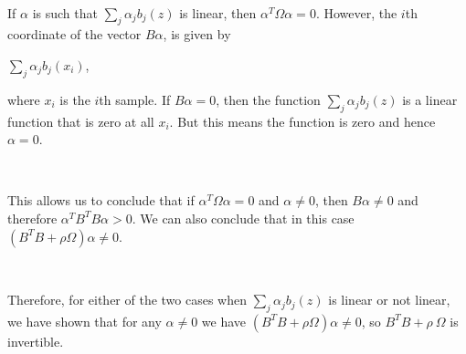 \documentclass[]{article}
\begin{document}
\begin{itemize}
\ 


If $\alpha$ is such that \( \displaystyle \sum_j \alpha_j b_j(z) \) is linear, then $\alpha^T \Omega \alpha  = 0$. However, the $i$th coordinate of the vector $B\alpha$, is given by
 

\hfil \( \displaystyle \sum_j \alpha_j b_j(x_i) \),
 

where $x_i$ is the $i$th sample. If $B\alpha = 0$, then the function \( \displaystyle \sum_j \alpha_j b_j(z) \) is a linear function that is zero at all $x_i$. But this means the function is zero and hence $\alpha=0$. 

\ 

This allows us to conclude that if $\alpha^T\Omega\alpha = 0$ and $\alpha \neq 0$, then $B\alpha\neq0$ and therefore $\alpha^TB^TB\alpha> 0$. We can also conclude that in this case $\left(B^TB+\rho \Omega \right)\alpha \neq 0$.

\ 

Therefore, for either of the two cases when $\sum_j \alpha_j b_j(z)$ is linear or not linear, we have shown that for any $\alpha \neq 0$ we have $\left(B^TB+\rho \Omega \right)\alpha \neq 0$, so $B^TB+\rho \  \Omega$ is invertible.
\end{itemize}

~
\end{document}
